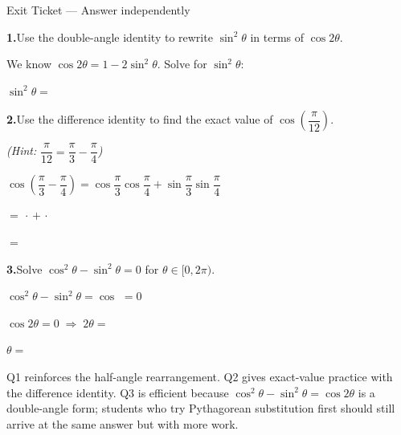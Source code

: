 \documentclass[10pt]{article}
\begin{document}
\namedateperiod

\vspace{0.12in}

\begin{notesbox}{Exit Ticket --- Answer independently}

\textbf{1.}\quad Use the double-angle identity to rewrite $\sin^2\theta$
in terms of $\cos 2\theta$.

\vspace{4pt}
We know $\cos 2\theta = 1 - 2\sin^2\theta$. Solve for $\sin^2\theta$:

\vspace{6pt}
$\sin^2\theta = $ 

\vspace{0.16in}
\textbf{2.}\quad Use the difference identity to find the exact value of
$\cos\!\left(\dfrac{\pi}{12}\right)$.

\vspace{4pt}
\textit{(Hint:} $\dfrac{\pi}{12} = \dfrac{\pi}{3} - \dfrac{\pi}{4}$\textit{)}

\vspace{4pt}
$\cos\!\left(\dfrac{\pi}{3} - \dfrac{\pi}{4}\right)
= \cos\dfrac{\pi}{3}\cos\dfrac{\pi}{4} + \sin\dfrac{\pi}{3}\sin\dfrac{\pi}{4}$

\vspace{6pt}
$= $  $\cdot$ 
$+$  $\cdot$ 

\vspace{6pt}
$= $ 

\vspace{0.16in}
\textbf{3.}\quad Solve $\cos^2\theta - \sin^2\theta = 0$ for $\theta \in [0, 2\pi)$.

\vspace{4pt}
$\cos^2\theta - \sin^2\theta = \cos$ \ans{$2\theta$} $= 0$

\vspace{6pt}
$\cos 2\theta = 0 \;\Rightarrow\; 2\theta = $ 

\vspace{6pt}
$\theta = $ 

\begin{teachernote}
Q1 reinforces the half-angle rearrangement. Q2 gives exact-value practice with the difference identity.
Q3 is efficient because $\cos^2\theta - \sin^2\theta = \cos 2\theta$ is a double-angle form; students who
try Pythagorean substitution first should still arrive at the same answer but with more work.
\end{teachernote}

\end{notesbox}
\end{document}
